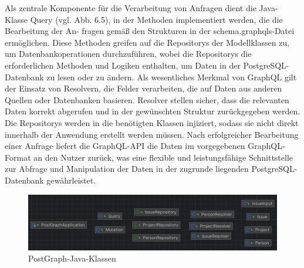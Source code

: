Als zentrale Komponente für die Verarbeitung von Anfragen dient die Java-Klasse Query (vgl. Abb. 6.5), in der Methoden implementiert werden, die die Bearbeitung der An- fragen gemäß den Strukturen in der schema.graphqls-Datei ermöglichen. Diese Methoden greifen auf die Repositorys der Modellklassen zu, um Datenbankoperationen durchzuführen, wobei die Repositorys die erforderlichen Methoden und Logiken enthalten, um Daten in der PostgreSQL-Datenbank zu lesen oder zu ändern. Als wesentliches Merkmal von GraphQL gilt der Einsatz von Resolvern, die Felder verarbeiten, die auf Daten aus anderen Quellen oder Datenbanken basieren. Resolver stellen sicher, dass die relevanten Daten korrekt abgerufen und in der gewünschten Struktur zurückgegeben werden. Die Repositorys werden in die benötigten Klassen injiziert, sodass sie nicht direkt innerhalb der Anwendung erstellt werden müssen. Nach erfolgreicher Bearbeitung einer Anfrage liefert die GraphQL-API die Daten im vorgegebenen GraphQL-Format an den Nutzer zurück, was eine flexible und leistungsfähige Schnittstelle zur Abfrage und Manipulation der Daten in der zugrunde liegenden PostgreSQL-Datenbank gewährleistet.
\begin{figure}[H]
	\centering
	\includegraphics[scale=0.5]{Illustrations/postgraph.png}
	\caption{ PostGraph-Java-Klassen}
\end{figure}

